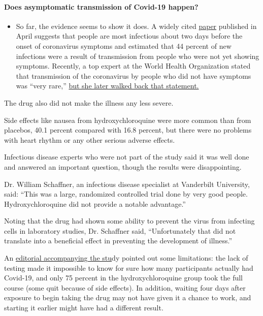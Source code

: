 \begin{itemize}
{  \paragraph{Does asymptomatic transmission of Covid-19
  happen?}\label{does-asymptomatic-transmission-of-covid-19-happen}}

  \begin{itemize}
  \tightlist
  \item
    So far, the evidence seems to show it does. A widely cited
    \href{https://www.nature.com/articles/s41591-020-0869-5}{paper}
    published in April suggests that people are most infectious about
    two days before the onset of coronavirus symptoms and estimated that
    44 percent of new infections were a result of transmission from
    people who were not yet showing symptoms. Recently, a top expert at
    the World Health Organization stated that transmission of the
    coronavirus by people who did not have symptoms was ``very rare,''
    \href{https://www.nytimes.com/2020/06/09/world/coronavirus-updates.html?action=click\&pgtype=Article\&state=default\&region=MAIN_CONTENT_3\&context=storylines_faq\#link-1f302e21}{but
    she later walked back that statement.}
  \end{itemize}
\end{itemize}

The drug also did not make the illness any less severe.

Side effects like nausea from hydroxychloroquine were more common than
from placebos, 40.1 percent compared with 16.8 percent, but there were
no problems with heart rhythm or any other serious adverse effects.

Infectious disease experts who were not part of the study said it was
well done and answered an important question, though the results were
disappointing.

Dr. William Schaffner, an infectious disease specialist at Vanderbilt
University, said: ``This was a large, randomized controlled trial done
by very good people. Hydroxychloroquine did not provide a notable
advantage.''

Noting that the drug had shown some ability to prevent the virus from
infecting cells in laboratory studies, Dr. Schaffner said,
``Unfortunately that did not translate into a beneficial effect in
preventing the development of illness.''

An \href{https://www.nejm.org/doi/full/10.1056/NEJMe2020388}{editorial
accompanying the stu}dy pointed out some limitations: the lack of
testing made it impossible to know for sure how many participants
actually had Covid-19, and only 75 percent in the hydroxychloroquine
group took the full course (some quit because of side effects). In
addition, waiting four days after exposure to begin taking the drug may
not have given it a chance to work, and starting it earlier might have
had a different result.

